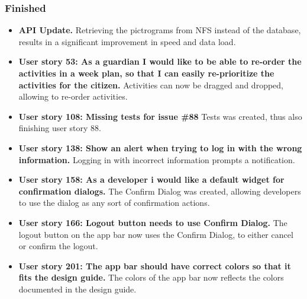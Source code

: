\subsubsection{Finished}
\begin{itemize}
    \item \textbf{API Update.}
        \subitem Retrieving the pictrograms from NFS instead of the database, results in a significant improvement in speed and data load.
    \item \textbf{User story 53: As a guardian I would like to be able to re-order the activities in a week plan, so that I can easily re-prioritize the activities for the citizen.}
        \subitem Activities can now be dragged and dropped, allowing to re-order activities.
    \item \textbf{User story 108: Missing tests for issue \#88 }
        \subitem Tests was created, thus also finishing user story 88.
    \item \textbf{User story 138: Show an alert when trying to log in with the wrong information.}
        \subitem Logging in with incorrect information prompts a notification.
    \item \textbf{User story 158: As a developer i would like a default widget for confirmation dialogs.}
        \subitem The Confirm Dialog was created, allowing developers to use the dialog as any sort of confirmation actions.
    \item \textbf{User story 166: Logout button needs to use Confirm Dialog.}
        \subitem The logout button on the app bar now uses the Confirm Dialog, to either cancel or confirm the logout.
    \item \textbf{User story 201: The app bar should have correct colors so that it fits the design guide.}
        \subitem The colors of the app bar now reflects the colors documented in the design guide. 
\end{itemize}

